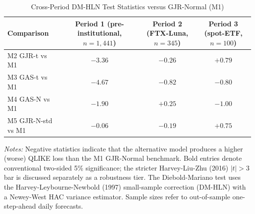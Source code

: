 
\begin{table}[htbp]
\centering
\caption{Cross-Period DM-HLN Test Statistics versus GJR-Normal (M1)}
\label{tab:dmhln}
\begin{threeparttable}
\begin{tabular}{lccc}
\toprule
Comparison & \makecell{Period 1 \\ (pre-institutional, $n=1{,}441$)} & \makecell{Period 2 \\ (FTX-Luna, $n=345$)} & \makecell{Period 3 \\ (spot-ETF, $n=100$)} \\
\midrule
M2 GJR-t vs M1     & $\mathbf{-3.36}$ & $-0.26$ & $+0.79$ \\ %
M3 GAS-t vs M1     & $\mathbf{-4.67}$ & $-0.82$ & $-0.80$ \\ %
M4 GAS-N vs M1     & $-1.90$          & $+0.25$ & $-1.00$ \\ %
M5 GJR-N-std vs M1 & $-0.06$          & $-0.19$ & $+0.75$ \\ %
\bottomrule
\end{tabular}
\begin{tablenotes}[flushleft]
\footnotesize
\item \textit{Notes:} Negative statistics indicate that the alternative model
produces a higher (worse) QLIKE loss than the M1 GJR-Normal benchmark.
Bold entries denote conventional two-sided 5\% significance; the stricter
Harvey-Liu-Zhu (2016) $|t| > 3$ bar is discussed separately as a robustness
tier. The Diebold-Mariano test uses the Harvey-Leybourne-Newbold (1997)
small-sample correction (DM-HLN) with a Newey-West HAC variance estimator.
Sample sizes refer to out-of-sample one-step-ahead daily forecasts.
\end{tablenotes}
\end{threeparttable}
\end{table}
